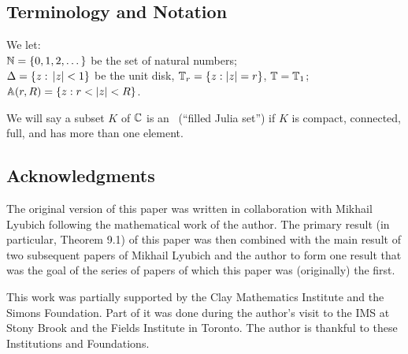 \subsection{Terminology and Notation}
We let:\\
${\Bbb N} =\{0, 1,2,\dots\}$ be the set of natural numbers;\\
$\Delta=\{z:\,  |z|<1\}$ be the unit disk, ${\Bbb T}_r=\{z: |z|=r\}$, ${\Bbb T}={\Bbb T}_1$;\\
$\A(r,R)= \{z: r<|z|<R\}$.

We will say a subset $K$ of ${\Bbb C}$ is an \fjset\ (``filled Julia set'')
if $K$ is compact, connected, full, and has more than one element.


\subsection{Acknowledgments}
The original version of this paper was written in collaboration with Mikhail Lyubich following
the mathematical work of the author. The primary result (in particular, Theorem 9.1) of this paper
was then combined with the main result of two subsequent papers 
\cite{decorations,molecules}
of Mikhail
Lyubich and the author to form one result that was the goal of the series
of papers of which this paper was (originally) the first.

This work was partially supported by the Clay Mathematics Institute and the Simons Foundation.
Part of it was done during the author's visit to the IMS at Stony Brook and the Fields Institute in Toronto.
The author is thankful to these Institutions and Foundations.
